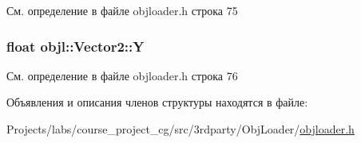 См. определение в файле objloader.\+h строка 75

\subsubsection[{\texorpdfstring{Y}{Y}}]{\setlength{\rightskip}{0pt plus 5cm}float objl\+::\+Vector2\+::Y}\hypertarget{structobjl_1_1_vector2_a25df0f9690a937dc76b1922b46c0fe7c}{}\label{structobjl_1_1_vector2_a25df0f9690a937dc76b1922b46c0fe7c}


См. определение в файле objloader.\+h строка 76



Объявления и описания членов структуры находятся в файле\+:\begin{DoxyCompactItemize}
\item 
Projects/labs/course\+\_\+project\+\_\+cg/src/3rdparty/\+Obj\+Loader/\hyperlink{3rdparty_2_obj_loader_2objloader_8h}{objloader.\+h}\end{DoxyCompactItemize}
